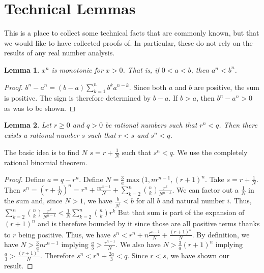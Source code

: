 \documentclass[12pt]{article}
\newtheorem{lemma}{Lemma}
\theoremstyle{remark}
\begin{document}
\section{Technical Lemmas}\label{app:A}

This is a place to collect some technical facts that are commonly known, but that we would like to have collected proofs of. In particular, these do not rely on the results of any real number analysis. 

\begin{lemma}
$x^n$ is monotonic for $x>0$. That is, if $0 < a < b$, then $a^n<b^n$.
\end{lemma}

\begin{proof}
$b^n-a^n= (b-a)\sum_{k=1}^n b^k a^{n-k}$. Since both $a$ and $b$ are positive, the sum is positive. The sign is therefore determined by $b-a$. If $b>a$, then $b^n-a^n > 0$ as was to be shown. 
\end{proof}

\begin{lemma}\label{app:lesser}
Let $r \geq 0 $ and $q > 0$ be rational numbers such that $r^n < q$. Then there exists a rational number $s$ such that $r < s$ and $s^n < q$.
\end{lemma}

The basic idea is to find $N$ $s = r + \tfrac{1}{N}$ such that $s^n < q$. We use the completely rational binomial theorem.  

\begin{proof}
Define $a = q - r^n$. Define $N = \tfrac{3}{a} \max(1,n r^{n-1}, (r+1)^n$.  Take $s = r + \tfrac{1}{N}$. Then $s^n = (r+ \tfrac{1}{N})^n = r^n + \tfrac{n r^{n-1}}{N} + \sum_{k=2}^{n} \binom{n}{k} \tfrac{r^k}{N^{n-k}}$. We can factor out a $\tfrac{1}{N}$ in the sum and, since $N > 1$, we have $\tfrac{b}{N^i} < b$ for all $b$ and natural number $i$. Thus, $\sum_{k=2}^{n} \binom{n}{k} \tfrac{r^k}{N^{n-k}} < \tfrac{1}{N} \sum_{k=2}^{n} \binom{n}{k} r^k$  But that sum is part of the expansion of $(r+1)^n$ and is therefore bounded by it since those are all positive terms thanks to $r$ being positive. Thus, we have $s^n < r^n + n \tfrac{r^{n-1}}{N} + \tfrac{ (r+1)^n }{N}$.  By definition, we have $N > \tfrac{3}{a} n r^{n-1}$ implying $\tfrac{a}{3} > \tfrac{ r^{n-1}}{N}$. We also have $N > \tfrac{3}{a} (r+1)^n$ implying $\tfrac{a}{3} > \tfrac{(r+1)^n}{N}$. Therefore $s^n < r^n + \tfrac{2 a}{3} < q$. Since $r<s$, we have shown our result. 
\end{proof}
\end{document}
